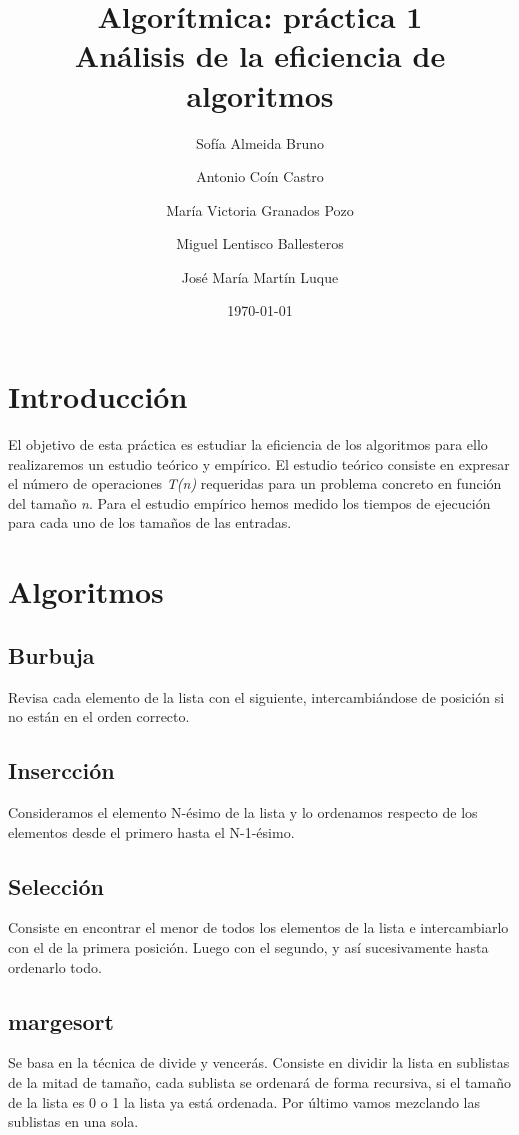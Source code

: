 \documentclass[11pt]{article}
\title{Algorítmica: práctica 1 \\ \large Análisis de la eficiencia de algoritmos}
\author{Sofía Almeida Bruno \and Antonio Coín Castro \and María Victoria Granados Pozo \and Miguel Lentisco Ballesteros \and José María Martín Luque}
\date{\today}
\begin{document}
\maketitle

\newpage

\section*{Introducción}
El objetivo de esta práctica es estudiar la eficiencia de los algoritmos para ello realizaremos un estudio teórico y empírico. 
El estudio teórico consiste en expresar el número de operaciones \textit{T(n)} requeridas para un problema concreto en función del tamaño \textit{n}. Para el estudio empírico hemos medido los tiempos de ejecución para cada uno de los tamaños de las entradas.

\section*{Algoritmos}
\subsection*{Burbuja}
Revisa cada elemento de la lista con el siguiente, intercambiándose de posición si no están en el orden correcto.
\subsection*{Insercción}
Consideramos el elemento N-ésimo de la lista y lo ordenamos respecto de los elementos desde el primero hasta el N-1-ésimo.

\subsection*{Selección}
Consiste en encontrar el menor de todos los elementos de la lista e intercambiarlo con el de la primera posición. Luego con el segundo, y así sucesivamente hasta ordenarlo todo.

\subsection*{margesort}
Se basa en la técnica de divide y vencerás. Consiste en dividir la lista en sublistas de la mitad de tamaño, cada sublista se ordenará de forma recursiva, si el tamaño de la lista es 0 o 1 la lista ya está ordenada. Por último vamos mezclando las sublistas en una sola.
\end{document}
